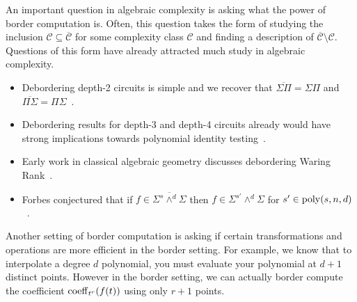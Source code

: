 \documentclass[letterpaper, 11pt]{amsart}
\newif\iffull
\begin{document}
\iffull
For any of the complexity classes we have defined above, we can define a border analogue.
This corresponds to a Zariski closure of the complexity class when the class of polynomials is viewed as a subset of affine space via their coefficient vectors.
We give the following definition for the closure of $\VP$, but defining the closures of $\VF$, $\VBP$, and $\VNP$ is completely analogous.
\begin{defn}[$\overline{\VP}$]
  The class $\overline{\VP}$ is the set of polynomials $f(x_1, \ldots, x_n)$ over $\F$ of degree $\poly(n)$ which are border computable by an algebraic circuit of size $\poly(n)$ over $\F(\e)$.
\end{defn}
\fi

An important question in algebraic complexity is asking what the power of border computation is.
Often, this question takes the form of studying the inclusion $\mathcal{C} \subseteq \overline{\mathcal{C}}$ for some complexity class $\mathcal{C}$ and finding a description of $\overline{\mathcal{C}} \setminus \mathcal{C}$.
Questions of this form have already attracted much study in algebraic complexity.
\begin{ex}
  \begin{itemize}
    \item Debordering depth-2 circuits is simple and we recover that $\overline{\Sigma \Pi} = \Sigma \Pi$ and $\overline{\Pi \Sigma} = \Pi \Sigma$~\cite{DL25}.
    \item Debordering results for depth-3 and depth-4 circuits already would have strong implications towards polynomial identity testing~\cite{AV08, Koi12, GKKS13}.
    \item Early work in classical algebraic geometry discusses debordering Waring Rank~\cite{Palatini:SuperficieAlg, Terr:seganti}.
    \item Forbes conjectured that if $f \in \overline{\Sigma^s \land^d \Sigma}$ then $f \in \Sigma^{s'} \land^d \Sigma$ for $s' \in \operatorname{poly}(s, n, d)$~\cite{wact-open-problems}.
  \end{itemize}
\end{ex}

\iffull
Another setting of border computation is asking if certain transformations and operations are more efficient in the border setting.
For example, we know that to interpolate a degree $d$ polynomial, you must evaluate your polynomial at $d + 1$ distinct points.
However in the border setting, we can actually border compute the coefficient $\operatorname{coeff}_{t^r}(f(t))$ using only $r + 1$ points.
\end{document}

